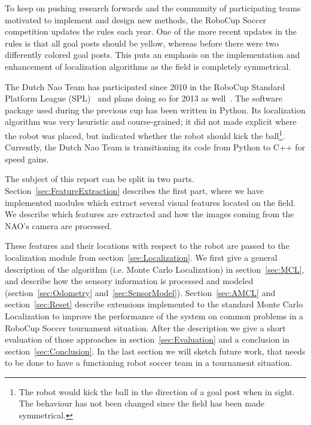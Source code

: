 \documentclass[	DIV=calc,%
							paper=a4,%
							fontsize=9pt,%
							twocolumn]{scrartcl}	 					%
\begin{document}
To keep on pushing research forwards and the community of participating teams motivated to implement and design new methods, the RoboCup Soccer competition updates the rules each year.  One of the more recent updates in the rules is that all goal posts should be yellow, whereas before there were two differently colored goal posts.  This puts an emphasis on the implementation and enhancement of localization algorithms as the field is completely symmetrical.

The Dutch Nao Team has participated since 2010 in the RoboCup Standard Platform League (SPL)~\cite{DNT-TD10, DNT-TD11, DNT-TD12} and plans doing so for 2013 as well~\cite{DNT-TD13}.  The software package used during the previous cup has been written in Python.  Its localization algorithm was very heuristic and course-grained; it did not made explicit where the robot was placed, but indicated whether the robot should kick the ball\footnote{The robot would kick the ball in the direction of a goal post when in sight. The behaviour has not been changed since the field has been made symmetrical.}.  Currently, the Dutch Nao Team is transitioning its code from Python to C++ for speed gains. 

The subject of this report can be split in two parts. Section~\ref{sec:FeatureExtraction} describes the first part, where we have implemented modules which extract several visual features located on the field.  We describe which features are extracted and how the images coming from the NAO's camera are processed. 

These features and their locations with respect to the robot are passed to the localization module from section~\ref{sec:Localization}.  We first give a general description of the algorithm (i.e. Monte Carlo Localization) in section~\ref{sec:MCL}, and describe how the sensory information is processed and modeled (section~\ref{sec:Odometry} and~\ref{sec:SensorModel}). Section~\ref{sec:AMCL} and section~\ref{sec:Reset} describe extensions implemented to the standard Monte Carlo Localization to improve the performance of the system on common problems in a RoboCup Soccer tournament situation. 
After the description we give a short evaluation of those approaches in section~\ref{sec:Evaluation} and a conclusion in section~\ref{sec:Conclusion}. In the last section we will sketch future work, that needs to be done to have a functioning robot soccer team in a tournament situation.
\end{document}
